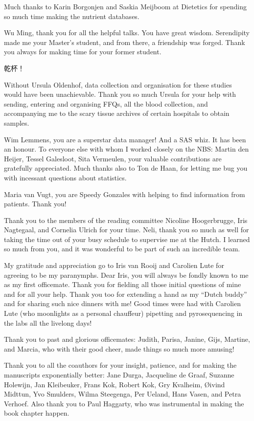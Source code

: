 \noindent Much thanks to Karin Borgonjen and Saskia Meijboom at Dietetics for spending so much time making the nutrient databases.

\noindent Wu Ming, thank you for all the helpful talks. You have great wisdom. Serendipity made me your Master's student, and from there, a friendship was forged. Thank you always for making time for your former student. \begin{CJK}{UTF8}{bsmi} 乾杯！\end{CJK}

\noindent Without Ursula Oldenhof, data collection and organisation for these studies would have been unachievable. Thank you so much Ursula for your help with sending, entering and organising FFQs, all the blood collection, and accompanying me to the scary tissue archives of certain hospitals to obtain samples.

\noindent Wim Lemmens, you are a superstar data manager! And a SAS whiz. It has been an honour. To everyone else with whom I worked closely on the NBS: Martin den Heijer, Tessel Galesloot, Sita Vermeulen, your valuable contributions are gratefully appreciated. Much thanks also to Ton de Haan, for letting me bug you with incessant questions about statistics.

\noindent Maria van Vugt, you are Speedy Gonzales with helping to find information from patients. Thank you!

\noindent Thank you to the members of the reading committee Nicoline Hoogerbrugge, Iris Nagtegaal, and Cornelia Ulrich for your time. Neli, thank you so much as well for taking the time out of your busy schedule to supervise me at the Hutch. I learned so much from you, and it was wonderful to be part of such an incredible team.

\noindent My gratitude and appreciation go to Iris van Rooij and Carolien Lute for agreeing to be my paranymphs. Dear Iris, you will always be fondly known to me as my first officemate. Thank you for fielding all those initial questions of mine and for all your help. Thank you too for extending a hand as my ``Dutch buddy'' and for sharing such nice dinners with me! Good times were had with Carolien Lute (who moonlights as a personal chauffeur) pipetting and pyrosequencing in the labs all the livelong days!

\noindent Thank you to past and glorious officemates: Judith, Parisa, Janine, Gijs, Martine, and Marcia, who with their good cheer, made things so much more amusing!

\noindent Thank you to all the coauthors for your insight, patience, and for making the manuscripts exponentially better: Jane Durga, Jacqueline de Graaf, Suzanne Holewijn, Jan Kleibeuker, Frans Kok, Robert Kok, Gry Kvalheim, {\O}ivind Midttun, Yvo Smulders, Wilma Steegenga, Per Ueland, Hans Vasen, and Petra Verhoef. Also thank you to Paul Haggarty, who was instrumental in making the book chapter happen.

